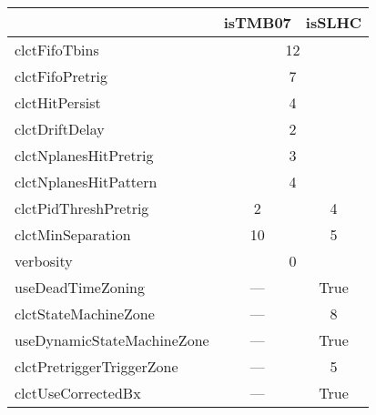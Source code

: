 \begin{center}
	\begin{tabular}{|l|c|c|}
		\hline
		& isTMB07 & isSLHC \\
		\hline
		\hline
		clctFifoTbins & \multicolumn{2}{c|}{12} \\
		\hline
		clctFifoPretrig & \multicolumn{2}{c|}{7} \\
		\hline
		clctHitPersist & \multicolumn{2}{c|}{4} \\
                \hline
		clctDriftDelay & \multicolumn{2}{c|}{2} \\
                \hline
		clctNplanesHitPretrig & \multicolumn{2}{c|}{3} \\
                \hline
		clctNplanesHitPattern & \multicolumn{2}{c|}{4} \\
                \hline
		clctPidThreshPretrig & 2 & 4 \\
		\hline
		clctMinSeparation  & 10 & 5 \\
		\hline
		verbosity & \multicolumn{2}{c|}{0} \\
                \hline
		useDeadTimeZoning & --- & True \\
		\hline
		clctStateMachineZone & --- & 8 \\
		\hline
		useDynamicStateMachineZone & --- & True \\
		\hline
		clctPretriggerTriggerZone & --- & 5 \\
		\hline
		clctUseCorrectedBx & --- & True \\
		\hline
	
	\end{tabular}
\end{center}

